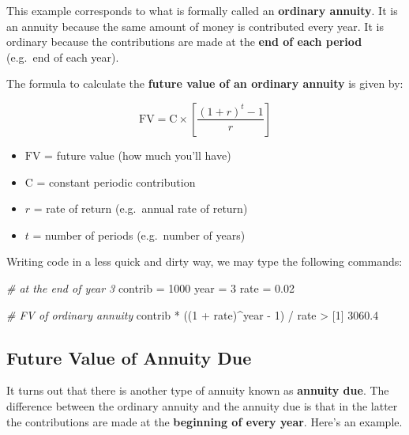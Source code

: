\documentclass[
]{book}
\newenvironment{Shaded}{\begin{snugshade}}{\end{snugshade}}
\newcommand{\CommentTok}[1]{\textcolor[rgb]{0.56,0.35,0.01}{\textit{#1}}}
\newcommand{\DecValTok}[1]{\textcolor[rgb]{0.00,0.00,0.81}{#1}}
\newcommand{\FloatTok}[1]{\textcolor[rgb]{0.00,0.00,0.81}{#1}}
\newcommand{\NormalTok}[1]{#1}
\newcommand{\OtherTok}[1]{\textcolor[rgb]{0.56,0.35,0.01}{#1}}
\newcommand{\SpecialCharTok}[1]{\textcolor[rgb]{0.00,0.00,0.00}{#1}}
\begin{document}
This example corresponds to what is formally called an \textbf{ordinary annuity}.
It is an annuity because the same amount of money is contributed every year.
It is ordinary because the contributions are made at the
\textbf{end of each period} (e.g.~end of each year).

The formula to calculate the \textbf{future value of an ordinary annuity} is given by:

\[
\text{FV} = \text{C} \times \left [ \frac{(1 + r)^t - 1}{r} \right]
\]

\begin{itemize}
\item
  \(\text{FV}\) = future value (how much you'll have)
\item
  \(\text{C}\) = constant periodic contribution
\item
  \(r\) = rate of return (e.g.~annual rate of return)
\item
  \(t\) = number of periods (e.g.~number of years)
\end{itemize}

Writing code in a less quick and dirty way, we may type the following commands:

\begin{Shaded}
\begin{Highlighting}[]
\CommentTok{\# at the end of year 3}
\NormalTok{contrib }\OtherTok{=} \DecValTok{1000}
\NormalTok{year }\OtherTok{=} \DecValTok{3}
\NormalTok{rate }\OtherTok{=} \FloatTok{0.02}

\CommentTok{\# FV of ordinary annuity}
\NormalTok{contrib }\SpecialCharTok{*}\NormalTok{ ((}\DecValTok{1} \SpecialCharTok{+}\NormalTok{ rate)}\SpecialCharTok{\^{}}\NormalTok{year }\SpecialCharTok{{-}} \DecValTok{1}\NormalTok{) }\SpecialCharTok{/}\NormalTok{ rate}
\SpecialCharTok{\textgreater{}}\NormalTok{ [}\DecValTok{1}\NormalTok{] }\FloatTok{3060.4}
\end{Highlighting}
\end{Shaded}

\hypertarget{future-value-of-annuity-due}{%
\subsection{Future Value of Annuity Due}\label{future-value-of-annuity-due}}

It turns out that there is another type of annuity known as \textbf{annuity due}.
The difference between the ordinary annuity and the annuity due is that in the
latter the contributions are made at the \textbf{beginning of every year}. Here's an
example.
\end{document}
